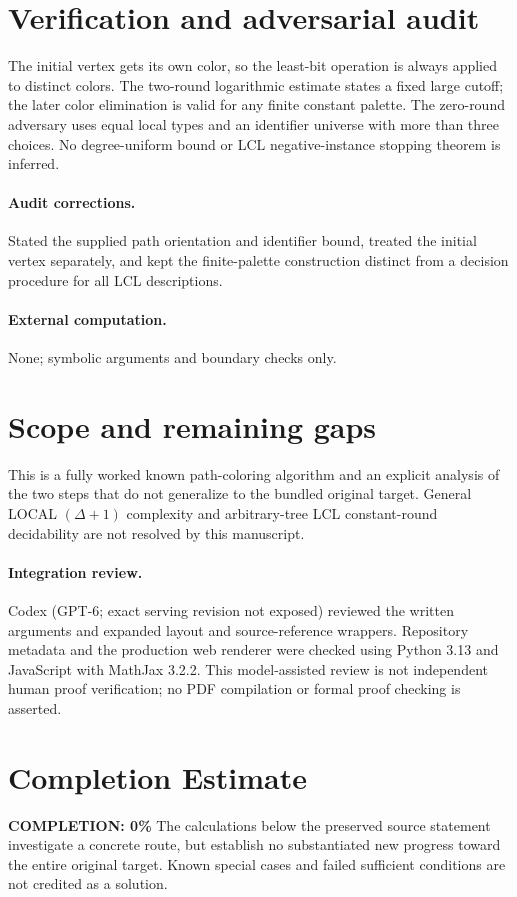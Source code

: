 \documentclass[11pt]{article}
\begin{document}
\section{Verification and adversarial audit}

The initial vertex gets its own color, so the least-bit operation is always
applied to distinct colors. The two-round logarithmic estimate states a fixed
large cutoff; the later color elimination is valid for any finite constant
palette. The zero-round adversary uses equal local types and an identifier
universe with more than three choices. No degree-uniform bound or LCL
negative-instance stopping theorem is inferred.

\paragraph{Audit corrections.} Stated the supplied path orientation and identifier bound, treated the
initial vertex separately, and kept the finite-palette construction distinct from
a decision procedure for all LCL descriptions.
\paragraph{External computation.} None; symbolic arguments and boundary checks only.
\section{Scope and remaining gaps}

This is a fully worked known path-coloring algorithm and an explicit analysis of
the two steps that do not generalize to the bundled original target. General
LOCAL $(\Delta+1)$ complexity and arbitrary-tree LCL constant-round
decidability are not resolved by this manuscript.

\paragraph{Integration review.} Codex (GPT-6; exact serving revision not exposed) reviewed the written arguments and expanded layout and source-reference wrappers. Repository metadata and the production web renderer were checked using Python 3.13 and JavaScript with MathJax 3.2.2. This model-assisted review is not independent human proof verification; no PDF compilation or formal proof checking is asserted.

\section{Completion Estimate}
\noindent\textbf{COMPLETION: 0\%}
The calculations below the preserved source statement investigate a concrete route,
but establish no substantiated new progress toward the entire original target.
Known special cases and failed sufficient conditions are not credited as a solution.
\end{document}
